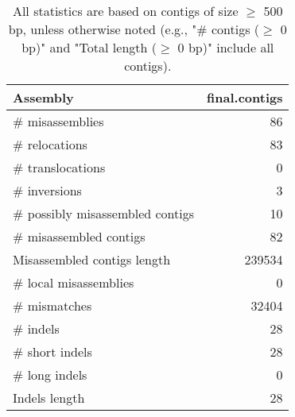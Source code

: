 \documentclass[12pt,a4paper]{article}
\begin{document}
\begin{table}[ht]
\begin{center}
\caption{All statistics are based on contigs of size $\geq$ 500 bp, unless otherwise noted (e.g., "\# contigs ($\geq$ 0 bp)" and "Total length ($\geq$ 0 bp)" include all contigs).}
\begin{tabular}{|l*{1}{|r}|}
\hline
Assembly & final.contigs \\ \hline
\# misassemblies & 86 \\ \hline
\hspace{5mm}\# relocations & 83 \\ \hline
\hspace{5mm}\# translocations & 0 \\ \hline
\hspace{5mm}\# inversions & 3 \\ \hline
\# possibly misassembled contigs & 10 \\ \hline
\# misassembled contigs & 82 \\ \hline
Misassembled contigs length & 239534 \\ \hline
\# local misassemblies & 0 \\ \hline
\# mismatches & 32404 \\ \hline
\# indels & 28 \\ \hline
\hspace{5mm}\# short indels & 28 \\ \hline
\hspace{5mm}\# long indels & 0 \\ \hline
Indels length & 28 \\ \hline
\end{tabular}
\end{center}
\end{table}
\end{document}

